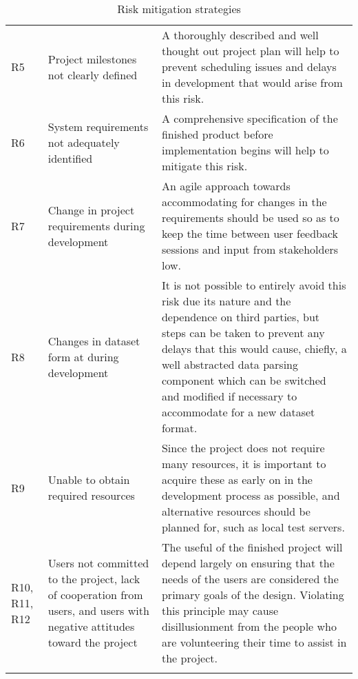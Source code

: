 \begin{longtable}{ | p{1cm} | p{6cm} | p{10cm} | }
R5 & Project milestones not clearly defined & A thoroughly described and well
thought out project plan will help to prevent scheduling issues and delays in
development that would arise from this risk.\\

R6 & System requirements not adequately identified & A comprehensive
specification of the finished product before implementation begins will help to
mitigate this risk.\\

R7 & Change in project requirements during development & An agile approach
towards accommodating for changes in the requirements should be used so as to
keep the time between user feedback sessions and input from stakeholders low.\\

R8 & Changes in dataset form at during development & It is not possible to
entirely avoid this risk due its nature and the dependence on third parties, but
steps can be taken to prevent any delays that this would cause, chiefly, a well
abstracted data parsing component which can be switched and modified if
necessary to accommodate for a new dataset format.\\

R9 & Unable to obtain required resources & Since the project does not require
many resources, it is important to acquire these as early on in the development
process as possible, and alternative resources should be planned for, such as
local test servers.\\

R10, R11, R12 & Users not committed to the project, lack of cooperation from
users, and users with negative attitudes toward the project & The useful of the
finished project will depend largely on ensuring that the needs of the users are
considered the primary goals of the design. Violating this principle may cause
disillusionment from the people who are volunteering their time to assist in the
project.\\

\hline
\caption{Risk mitigation strategies}
\label{tab:mitigation-strategies}
\end{longtable}
